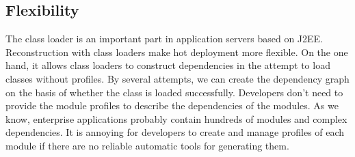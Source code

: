 \documentclass[conference]{IEEEtran}
\begin{document}

\subsection{Flexibility}

The class loader is an important part in application servers based on J2EE.
Reconstruction with class loaders make hot deployment more flexible.
On the one hand, it allows class loaders to construct dependencies in the attempt to load classes without profiles.
By several attempts, we can create the dependency graph on the basis of whether the class is loaded successfully.
Developers don't need to provide the module profiles to describe the dependencies of the modules.
As we know, enterprise applications probably contain hundreds of modules and complex dependencies.
It is annoying for developers to create and manage profiles of each module if there are no reliable automatic tools for generating them.
\end{document}

